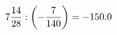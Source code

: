 \documentclass[preview]{standalone}
\begin{document}
\begin{align*}
7 { 14 \over 28 }  :  \left( - { 7 \over 140 } \right) = -150.0
\end{align*}
\end{document}
